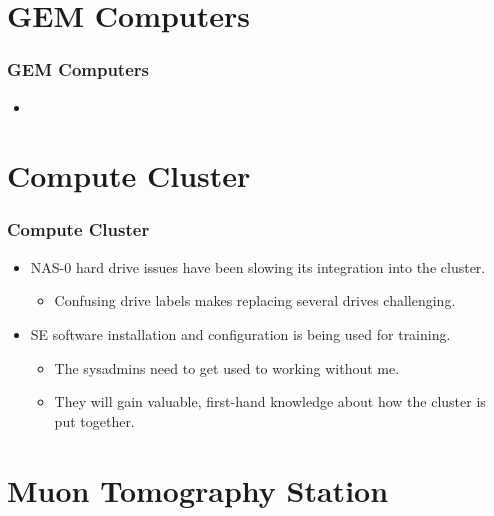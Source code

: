 \documentclass[aspectratio=169]{beamer}
\begin{document}

\section{GEM Computers}

\begin{frame}

  \frametitle{GEM Computers}

  \begin{itemize}
    \item 
  \end{itemize}

\end{frame}



\section{Compute Cluster}

\begin{frame}

  \frametitle{Compute Cluster}

  \begin{itemize}
  \item NAS-0 hard drive issues have been slowing its integration into the cluster.
    \begin{itemize}
      \item Confusing drive labels makes replacing several drives challenging.
    \end{itemize}
  \item SE software installation and configuration is being used for training.
    \begin{itemize}
    \item The sysadmins need to get used to working without me.
    \item They will gain valuable, first-hand knowledge about how the
      cluster is put together.
    \end{itemize}
  \end{itemize}
  
\end{frame}


\section{Muon Tomography Station}
\end{document}
